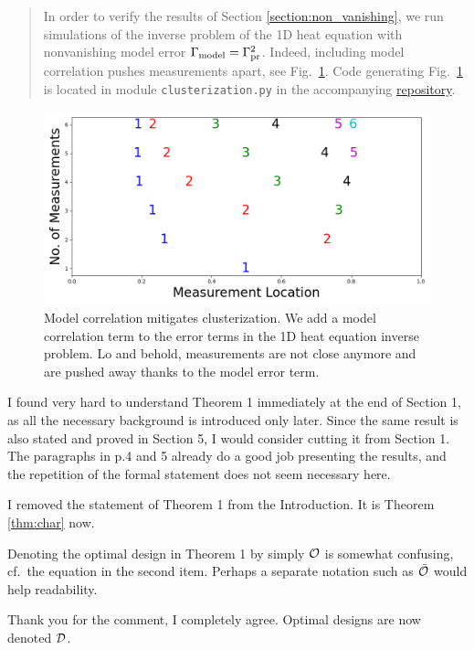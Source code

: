 \begin{quote}
  In order to verify the results of Section
  \ref{section:non_vanishing}, we run simulations of the inverse
  problem of the 1D heat equation with nonvanishing model error
  \(\Gamma_{\textup{model}} = \Gamma_{\textup{pr}}^2 \). Indeed, including model correlation pushes
  measurements apart, see Fig.~\ref{fig:corr_errors}. Code generating
  Fig.~\ref{fig:corr_errors} is located in module
  \texttt{clusterization.py} in the accompanying
  \href{https://github.com/yairdaon/OED}{repository}.
\end{quote}
\begin{figure}
  \centering
  \includegraphics[height=0.5\textwidth]{../latex/figs/dst_modelError4.png}
  \caption{Model correlation mitigates clusterization. We add a
    model correlation term to the error terms in the 1D heat
    equation inverse problem. Lo and behold, measurements are not
    close anymore and are pushed away thanks to the model error
    term.}
    \label{fig:corr_errors}
\end{figure}

  
\RC I found very hard to understand Theorem 1 immediately at the end
of Section 1, as all the necessary background is introduced only
later. Since the same result is also stated and proved in Section 5, I
would consider cutting it from Section 1. The paragraphs in p.4 and 5
already do a good job presenting the results, and the repetition of
the formal statement does not seem necessary here.

\AR I removed the statement of Theorem 1 from the Introduction. It is
Theorem \ref{thm:char} now.


\RC Denoting the optimal design in Theorem 1 by simply $\mathcal{O}$ is
somewhat confusing, cf.~the equation in the second item. Perhaps a
separate notation such as $\bar{\mathcal{O}}$ would help readability.

\AR Thank you for the comment, I completely agree. Optimal designs are
now denoted $\mathcal{D}$.


